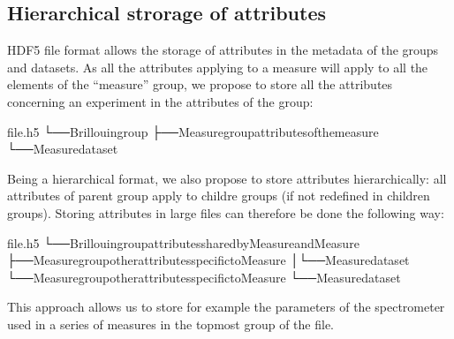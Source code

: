 \documentclass[letterpaper,10pt,english]{sphinxmanual}
\begin{document}
\subsection{Hierarchical strorage of attributes}
\label{\detokenize{source/normalization:hierarchical-strorage-of-attributes}}
\sphinxAtStartPar
HDF5 file format allows the storage of attributes in the metadata of the groups and datasets. As all the attributes applying to a measure will apply to all the elements of the “measure” group, we propose to store all the attributes concerning an experiment in the attributes of the group:

\begin{sphinxVerbatim}[commandchars=\\\{\}]
file.h5
└──Brillouingroup
├──Measuregroup\PYGZhy{}\PYGZgt{}attributesofthemeasure
└──Measuredataset
\end{sphinxVerbatim}

\sphinxAtStartPar
Being a hierarchical format, we also propose to store attributes hierarchically: all attributes of parent group apply to childre groups (if not redefined in children groups). Storing attributes in large files can therefore be done the following way:

\begin{sphinxVerbatim}[commandchars=\\\{\}]
file.h5
└──Brillouingroup\PYGZhy{}\PYGZgt{}attributessharedbyMeasureandMeasure
├──Measuregroup\PYGZhy{}\PYGZgt{}otherattributesspecifictoMeasure
│└──Measuredataset
└──Measuregroup\PYGZhy{}\PYGZgt{}otherattributesspecifictoMeasure
└──Measuredataset
\end{sphinxVerbatim}

\sphinxAtStartPar
This approach allows us to store for example the parameters of the spectrometer used in a series of measures in the topmost group of the file.
\end{document}
